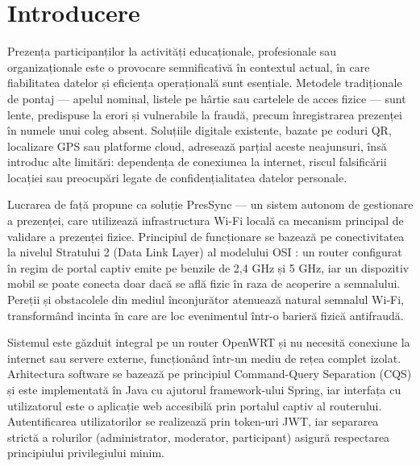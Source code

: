 \documentclass[a4paper,12pt,oneside]{report}
\makeatletter
\renewcommand{\ps@PageNormale}{%
  \renewcommand{\@oddhead}{}%
  \renewcommand{\@evenhead}{}%
  \renewcommand{\@oddfoot}{\hfil\thepage\hfil}%
  \renewcommand{\@evenfoot}{\hfil\thepage\hfil}%
}
\renewcommand{\ps@PageSpeciale}{%
  \renewcommand{\@oddhead}{}%
  \renewcommand{\@evenhead}{}%
  \renewcommand{\@oddfoot}{\hfil\thepage\hfil}%
  \renewcommand{\@evenfoot}{\hfil\thepage\hfil}%
}
\makeatother
\begin{document}
\hfuzz=100pt
\vfuzz=100pt
\raggedbottom

\makeatletter
\renewcommand{\ps@PageNormale}{%
  \renewcommand{\@oddhead}{}%
  \renewcommand{\@evenhead}{}%
  \renewcommand{\@oddfoot}{\hfil\thepage\hfil}%
  \renewcommand{\@evenfoot}{\hfil\thepage\hfil}%
}
\renewcommand{\ps@PageSpeciale}{%
  \renewcommand{\@oddhead}{}%
  \renewcommand{\@evenhead}{}%
  \renewcommand{\@oddfoot}{\hfil\thepage\hfil}%
  \renewcommand{\@evenfoot}{\hfil\thepage\hfil}%
}
\makeatother
\maketitle

\tableofcontents
\listoffigures
\newpage
{}

\chapter{Introducere}

Prezența participanților la activități educaționale, profesionale sau organizaționale este o provocare semnificativă în contextul actual, în care fiabilitatea datelor și eficiența operațională sunt esențiale. Metodele tradiționale de pontaj — apelul nominal, listele pe hârtie sau cartelele de acces fizice — sunt lente, predispuse la erori și vulnerabile la fraudă, precum înregistrarea prezenței în numele unui coleg absent. Soluțiile digitale existente, bazate pe coduri QR, localizare GPS sau platforme cloud, adresează parțial aceste neajunsuri, însă introduc alte limitări: dependența de conexiunea la internet, riscul falsificării locației sau preocupări legate de confidențialitatea datelor personale.

Lucrarea de față propune ca soluție PresSync — un sistem autonom de gestionare a prezenței, care utilizează infrastructura Wi-Fi locală ca mecanism principal de validare a prezenței fizice. Principiul de funcționare se bazează pe conectivitatea la nivelul Stratului 2 (Data Link Layer) al modelului OSI \cite{tanenbaum04}: un router configurat în regim de portal captiv emite pe benzile de 2,4 GHz și 5 GHz, iar un dispozitiv mobil se poate conecta doar dacă se află fizic în raza de acoperire a semnalului. Pereții și obstacolele din mediul înconjurător atenuează natural semnalul Wi-Fi, transformând incinta în care are loc evenimentul într-o barieră fizică antifraudă.

Sistemul este găzduit integral pe un router OpenWRT și nu necesită conexiune la internet sau servere externe, funcționând într-un mediu de rețea complet izolat. Arhitectura software se bazează pe principiul Command-Query Separation (CQS) și este implementată în Java cu ajutorul framework-ului Spring, iar interfața cu utilizatorul este o aplicație web accesibilă prin portalul captiv al routerului. Autentificarea utilizatorilor se realizează prin token-uri JWT, iar separarea strictă a rolurilor (administrator, moderator, participant) asigură respectarea principiului privilegiului minim.
\end{document}
